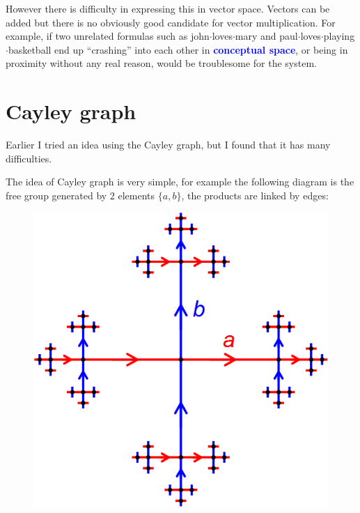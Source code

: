 \documentclass[12pt]{article}
\newcommand{\concept}[1]{\textbf{\textcolor{blue}{#1}}}
\newcommand{\formula}[1]{\textcolor{LogicColor}{#1}}
\begin{document}
However there is difficulty in expressing this in vector space.  Vectors can be added but there is no obviously good candidate for vector multiplication.  For example, if two unrelated formulas such as \formula{john$\cdot$loves$\cdot$mary} and \formula{paul$\cdot$loves$\cdot$playing$\cdot$basketball} end up ``crashing'' into each other in \concept{conceptual space}, or being in proximity without any real reason, would be troublesome for the system.

\section{Cayley graph}

Earlier I tried an idea using the Cayley graph, but I found that it has many difficulties.

The idea of Cayley graph is very simple, for example the following diagram is the free group generated by 2 elements $\{ a, b \}$, the products are linked by edges:
\begin{figure}[H]
\centering
\includegraphics[scale=0.25]{cayley-graph.jpg}
\end{figure}
\end{document}
